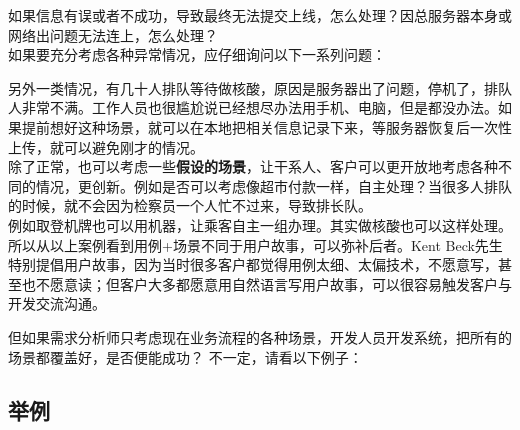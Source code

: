 如果信息有误或者不成功，导致最终无法提交上线，怎么处理？因总服务器本身或网络出问题无法连上，怎么处理？\\

如果要充分考虑各种异常情况，应仔细询问以下一系列问题：\\



另外一类情况，有几十人排队等待做核酸，原因是服务器出了问题，停机了，排队人非常不满。工作人员也很尴尬说已经想尽办法用手机、电脑，但是都没办法。如果提前想好这种场景，就可以在本地把相关信息记录下来，等服务器恢复后一次性上传，就可以避免刚才的情况。\\
除了正常，也可以考虑一些\textbf{假设的场景}，让干系人、客户可以更开放地考虑各种不同的情况，更创新。例如是否可以考虑像超市付款一样，自主处理？当很多人排队的时候，就不会因为检察员一个人忙不过来，导致排长队。\\
例如取登机牌也可以用机器，让乘客自主一组办理。其实做核酸也可以这样处理。\\
所以从以上案例看到用例+场景不同于用户故事，可以弥补后者。Kent
Beck先生特别提倡用户故事，因为当时很多客户都觉得用例太细、太偏技术，不愿意写，甚至也不愿意读；但客户大多都愿意用自然语言写用户故事，可以很容易触发客户与开发交流沟通。

但如果需求分析师只考虑现在业务流程的各种场景，开发人员开发系统，把所有的场景都覆盖好，是否便能成功？
不一定，请看以下例子：

\hypertarget{ux4e3eux4f8b}{%
\subsection{举例}\label{ux4e3eux4f8b}}

